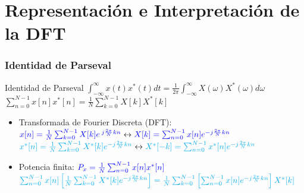 \section{Representación e Interpretación de la DFT}


\begin{frame}\frametitle{Identidad de Parseval}
  \begin{alertblock}{\centering Identidad de Parseval}
    \vspace{0.2cm} \centering
    $\int_{-\infty}^{\infty}x(t)x^*(t)dt = \frac{1}{2\pi}\int_{-\infty}^{\infty}X(\omega)X^*(\omega)d\omega$ \\ \vspace{0.3cm}
    $\sum_{n=0}^{N-1}x[n] x^{*}[n] = \frac{1}{N}\sum_{k=0}^{N-1} X[k] X^*[k]$ \\ \vspace{0.3cm}
  \end{alertblock}

  \begin{itemize}
    \item Transformada de Fourier Discreta (DFT): \\
    \vspace{0.2cm}
    $\color{blue}x[n]=\frac{1}{N}\sum_{k=0}^{N-1}X[k]e^{\:j\frac{2\pi}{N}k n}\color{black}
      \leftrightarrow
     \color{blue}X[k]=\sum_{n=0}^{N-1}x[n]e^{-j\frac{2\pi}{N}k n}\color{black}$
    \\ \vspace{0.2cm}
    {\footnotesize $\color{cyan}x^*[n]=\frac{1}{N}\sum_{k=0}^{N-1}X^*[k]e^{-j\frac{2\pi}{N}k n}\color{black}
      \leftrightarrow
     \color{cyan}X^*[-k]=\sum_{n=0}^{N-1}x^*[n]e^{-j\frac{2\pi}{N}k n}\color{black}$
    }
    \vspace{0.2cm}
    \item Potencia finita: $\color{blue}P_x = \frac{1}{N}\sum_{n=0}^{N-1}x[n]x^*[n]\color{black}$ \\ \vspace{0.2cm}
    {\footnotesize
      $\color{cyan}\sum_{n=0}^{N-1}x[n] \left[\frac{1}{N}\sum_{k=0}^{N-1}X^*[k]e^{-j\frac{2\pi}{N}k n}\right]
          = \frac{1}{N} \sum_{k=0}^{N-1} \left[\sum_{n=0}^{N-1}x[n]e^{-j\frac{2\pi}{N}k n}\right] X^*[k]\color{black}$
    }
  \end{itemize}

\end{frame}


